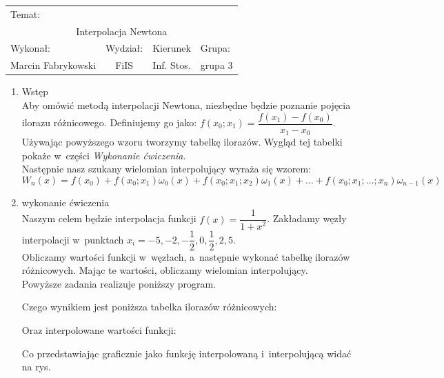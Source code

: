 \documentclass[12pt,a4paper]{article}
\begin{document}
 
\large
\begin{tabular}{|c|c|c|c|}
\hline
\multicolumn{4}{|l|}{Temat:}\\
\multicolumn{4}{|c|}{Interpolacja Newtona}\\
\hline
\multicolumn{1}{|l}{Wykonał:}&\multicolumn{1}{|l}{Wydział:}&\multicolumn{1}{|c}{Kierunek}&\multicolumn{1}{|l|}{Grupa:}\\
Marcin Fabrykowski&FiIS&Inf. Stos.&grupa 3\\
\hline
\end{tabular}
\normalsize
\vspace{2cm}
\begin{enumerate}
\item Wstęp\\
Aby omówić metodą interpolacji Newtona, niezbędne będzie poznanie pojęcia ilorazu różnicowego. Definiujemy go jako: $f(x_0;x_1)=\dfrac{f(x_1)-f(x_0)}{x_1-x_0}$.\\
Używając powyższego wzoru tworzymy tabelkę ilorazów. Wygląd tej tabelki pokaże w~części \textit{Wykonanie ćwiczenia}.\\
Następnie nasz szukany wielomian interpolujący wyraża się wzorem:$$W_n(x)=f(x_0)+f(x_0;x_1)\omega_0(x)+f(x_0;x_1;x_2)\omega_1(x)+\dots+f(x_0;x_1;\dots;x_n)\omega_{n-1}(x)$$
\item wykonanie ćwiczenia\\
Naszym celem będzie interpolacja funkcji $f(x)=\dfrac{1}{1+x^2}$. Zakładamy węzły interpolacji w~punktach $x_i=-5,-2,-\dfrac{1}{2},0,\dfrac{1}{2},2,5$.\\
Obliczamy wartości funkcji w~węzłach, a~następnie wykonać tabelkę ilorazów różnicowych. Mając te wartości, obliczamy wielomian interpolujący.\\
Powyższe zadania realizuje poniższy program.

Czego wynikiem jest poniższa tabelka ilorazów różnicowych:
\footnotesize

\normalsize
Oraz interpolowane wartości funkcji:
\footnotesize

\normalsize
Co przedstawiając graficznie jako funkcję interpolowaną i~interpolującą widać na rys.
\begin{figure}

\end{figure}
\end{enumerate}
\end{document}
